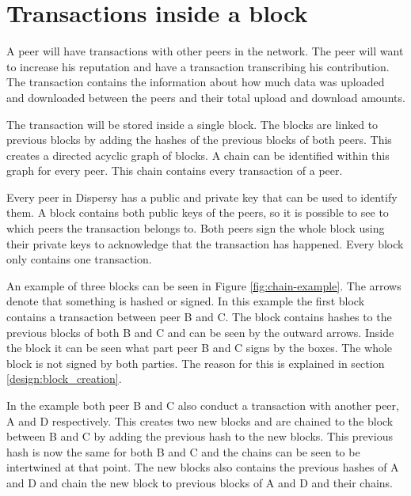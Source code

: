 \section{Transactions inside a block}
A peer will have transactions with other peers in the network.
The peer will want to increase his reputation and have a transaction transcribing his contribution.
The transaction contains the information about how much data was uploaded and downloaded between the peers
and their total upload and download amounts.

The transaction will be stored inside a single block.
The blocks are linked to previous blocks by adding the hashes of the previous blocks of both peers.
This creates a directed acyclic graph of blocks.
A chain can be identified within this graph for every peer.
This chain contains every transaction of a peer.

Every peer in Dispersy has a public and private key that can be used to identify them.
A block contains both public keys of the peers,
so it is possible to see to which peers the transaction belongs to.
Both peers sign the whole block using their private keys to acknowledge that the transaction has happened.
Every block only contains one transaction.

An example of three blocks can be seen in Figure \ref{fig:chain-example}.
The arrows denote that something is hashed or signed.
In this example the first block contains a transaction between peer B and C.
The block contains hashes to the previous blocks of both B and C
and can be seen by the outward arrows.
Inside the block it can be seen what part peer B and C signs by the boxes.
The whole block is not signed by both parties.
The reason for this is explained in section \ref{design:block_creation}.

In the example both peer B and C also conduct a transaction with another peer, A and D respectively.
This creates two new blocks and are chained to the block between B and C by adding the previous hash to the new blocks.
This previous hash is now the same for both B and C and the chains can be seen to be intertwined at that point.
The new blocks also contains the previous hashes of A and D
and chain the new block to previous blocks of A and D and their chains.

